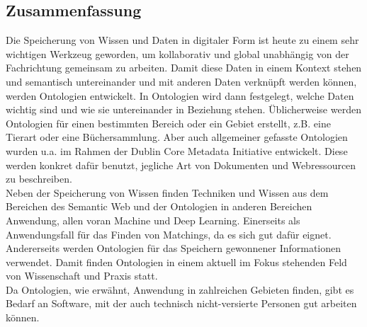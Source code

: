 %
\pagestyle{empty}

\subsection*{Zusammenfassung}

Die Speicherung von Wissen und Daten in digitaler Form ist heute zu einem sehr
wichtigen Werkzeug geworden, um kollaborativ und global unabhängig von der Fachrichtung gemeinsam zu arbeiten. Damit diese Daten in einem Kontext stehen und semantisch untereinander und mit anderen Daten verknüpft werden können, werden Ontologien entwickelt. In Ontologien wird dann festgelegt, welche Daten wichtig sind und wie sie untereinander in Beziehung stehen. Üblicherweise werden Ontologien für einen bestimmten Bereich oder ein Gebiet erstellt, z.B. eine Tierart oder eine Büchersammlung. Aber auch allgemeiner gefasste Ontologien wurden u.a. im Rahmen der Dublin Core Metadata Initiative  entwickelt. Diese werden konkret dafür benutzt, jegliche Art von Dokumenten und Webressourcen zu beschreiben.\\
Neben der Speicherung von Wissen finden Techniken und Wissen aus dem Bereichen
des Semantic Web und der Ontologien in anderen Bereichen Anwendung, allen voran
Machine und Deep Learning. Einerseits als Anwendungsfall für das Finden von
Matchings, da es sich gut dafür eignet. Andererseits werden Ontologien für das Speichern gewonnener Informationen verwendet. Damit finden Ontologien in einem aktuell im Fokus stehenden Feld von Wissenschaft und Praxis statt.\\
Da Ontologien, wie erwähnt, Anwendung in zahlreichen Gebieten finden, gibt es
Bedarf an Software, mit der auch technisch nicht-versierte Personen gut arbeiten
können.


